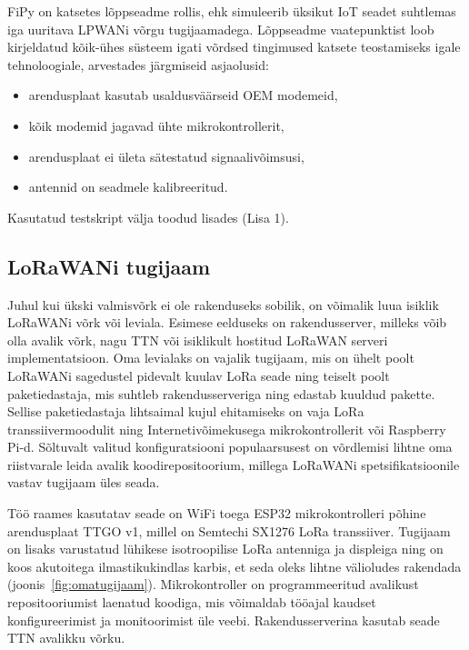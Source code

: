 \documentclass[12pt]{article}
\begin{document}
    FiPy on katsetes lõppseadme rollis, ehk simuleerib üksikut IoT seadet suhtlemas iga uuritava LPWANi võrgu tugijaamadega.
    Lõppseadme vaatepunktist loob kirjeldatud kõik-ühes süsteem igati võrdsed tingimused katsete teostamiseks igale tehnoloogiale, arvestades järgmiseid asjaolusid:
    \begin{itemize}
        \item arendusplaat kasutab usaldusväärseid OEM modemeid,
        \item kõik modemid jagavad ühte mikrokontrollerit,
        \item arendusplaat ei ületa sätestatud signaalivõimsusi,
        \item antennid on seadmele kalibreeritud.
    \end{itemize}
    Kasutatud testskript välja toodud lisades (Lisa 1).

    \subsection{LoRaWANi tugijaam}

    Juhul kui ükski valmisvõrk ei ole rakenduseks sobilik, on võimalik luua isiklik LoRaWANi võrk või leviala.
    Esimese eelduseks on rakendusserver, milleks võib olla avalik võrk, nagu TTN või isiklikult hostitud LoRaWAN serveri implementatsioon.
    Oma levialaks on vajalik tugijaam, mis on ühelt poolt LoRaWANi sagedustel pidevalt kuulav LoRa seade ning teiselt poolt paketiedastaja, mis suhtleb rakendusserveriga ning edastab kuuldud pakette.
    Sellise paketiedastaja lihtsaimal kujul ehitamiseks on vaja LoRa transsiivermoodulit ning Internetivõimekusega mikrokontrollerit või Raspberry Pi-d.
    Sõltuvalt valitud konfiguratsiooni populaarsusest on võrdlemisi lihtne oma riistvarale leida avalik koodirepositoorium, millega LoRaWANi spetsifikatsioonile vastav tugijaam üles seada.

    Töö raames kasutatav seade on WiFi toega ESP32 mikrokontrolleri põhine arendusplaat TTGO v1, millel on Semtechi SX1276 LoRa transsiiver.
    Tugijaam on lisaks varustatud lühikese isotroopilise LoRa antenniga ja displeiga ning on koos akutoitega ilmastikukindlas karbis, et seda oleks lihtne välioludes rakendada (joonis~\ref{fig:omatugijaam}).
    Mikrokontroller on programmeeritud avalikust repositooriumist laenatud koodiga, mis võimaldab tööajal kaudset konfigureerimist ja monitoorimist üle veebi.
    Rakendusserverina kasutab seade TTN avalikku võrku.
\end{document}
